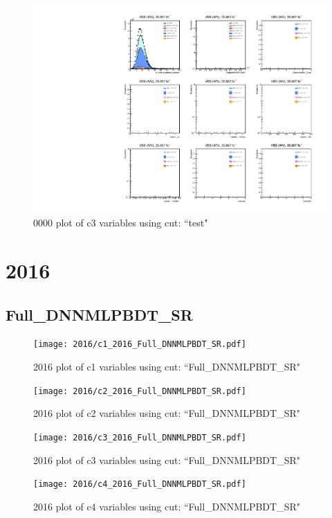 \documentclass{article}
\begin{document}
                        \begin{figure}[H]
                            \centering
                            \caption{0000 plot of c3 variables using cut: ``test"}
                            \includegraphics[width=\textwidth]{0000/c3_0000_test.pdf}
                        \end{figure}    
    \section*{2016}
      \subsection*{Full\_DNNMLPBDT\_SR}
                        \begin{figure}[H]
                            \centering
                            \caption{2016 plot of c1 variables using cut: ``Full\_DNNMLPBDT\_SR"}
                            \texttt{[image: 2016/c1\_2016\_Full\_DNNMLPBDT\_SR.pdf]}
                        \end{figure}    
                        \begin{figure}[H]
                            \centering
                            \caption{2016 plot of c2 variables using cut: ``Full\_DNNMLPBDT\_SR"}
                            \texttt{[image: 2016/c2\_2016\_Full\_DNNMLPBDT\_SR.pdf]}
                        \end{figure}    
                        \begin{figure}[H]
                            \centering
                            \caption{2016 plot of c3 variables using cut: ``Full\_DNNMLPBDT\_SR"}
                            \texttt{[image: 2016/c3\_2016\_Full\_DNNMLPBDT\_SR.pdf]}
                        \end{figure}    
                        \begin{figure}[H]
                            \centering
                            \caption{2016 plot of c4 variables using cut: ``Full\_DNNMLPBDT\_SR"}
                            \texttt{[image: 2016/c4\_2016\_Full\_DNNMLPBDT\_SR.pdf]}
                        \end{figure}    
\end{document}
